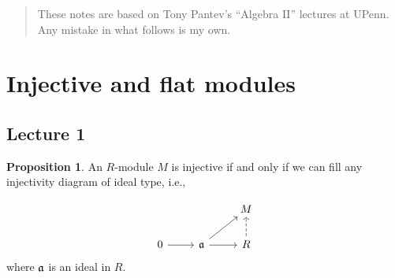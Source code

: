 \documentclass[10pt,letterpaper,cm]{nupset}
\theoremstyle{definition}
\theoremstyle{theorem}
\newtheorem{prop}[definition]{Proposition}
\theoremstyle{remark}
\newcommand{\1}{\mathbf{1}}
\newcommand{\0}{\vec 0}
\begin{document}
\thispagestyle{empty}
\begin{abstract}
These notes are based on Tony Pantev's ``Algebra II'' lectures at UPenn. Any mistake in what follows is my own.
\end{abstract}

\tableofcontents
\newpage

\section{Injective and flat modules}

\subsection{Lecture 1}

\begin{prop} An $R$-module $M$ is injective if and only if we can fill any injectivity diagram of ideal type, i.e.,  

\[
\begin{tikzcd}
 &  & M \\
0 \arrow[r] & \frak{a} \arrow[r] \arrow[ru] & R \arrow[u, dashed]
\end{tikzcd}
\] 
where $\frak{a}$ is an ideal in $R$.
\end{prop}
\end{document}
